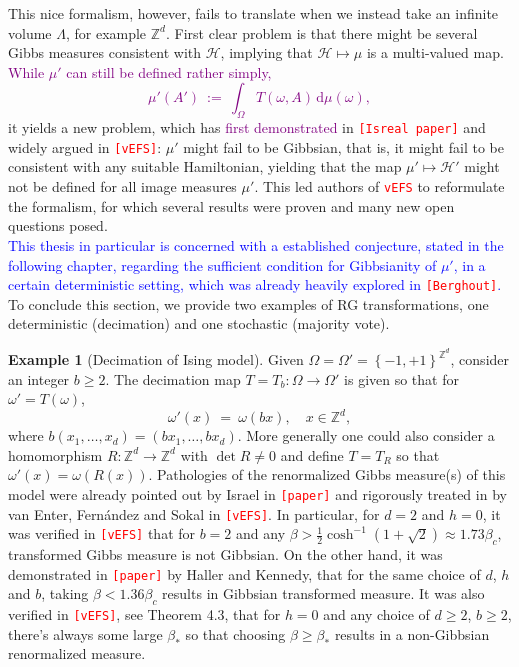 \documentclass[12pt]{article}
\renewcommand{\d}{\mathrm{d}}
\renewcommand{\H}{\mathcal{H}}
\newcommand{\Z}{\mathbb{Z}}
\newcommand{\set}[1]{\left\{#1\right\}}
\newcommand{\ra}{\rightarrow}
\newcommand{\1}{\mathbbm{1}}
\newcommand{\5}{\vspace{0.5cm}}
\theoremstyle{definition}
\newtheorem{ex}[thm]{Example}
\begin{document}
This nice formalism, however, fails to translate when we instead take an infinite volume $\Lambda$, for example $\Z^d$. First clear problem is that there might be several Gibbs measures consistent with $\H$, implying that $\H\mapsto\mu$ is a multi-valued map. \textcolor{purple}{While $\mu'$ can still be defined rather simply,
$$\mu'(A') ~:=~ \int_\Omega T(\omega,A)\,\d\mu(\omega),$$}
it yields a new problem, which has \textcolor{purple}{first demonstrated} in \textcolor{red}{\texttt{[Isreal paper]}} and widely argued in \textcolor{red}{\texttt{[vEFS]}}: $\mu'$ might fail to be Gibbsian, that is, it might fail to be consistent with any suitable Hamiltonian, yielding that the map $\mu'\mapsto\H'$ might not be defined for all image measures $\mu'$. This led authors of \textcolor{red}{\texttt{vEFS}} to reformulate the formalism, for which several results were proven and many new open questions posed. \\

\textcolor{blue}{This thesis in particular is concerned with a established conjecture, stated in the following chapter, regarding the sufficient condition for Gibbsianity of $\mu'$, in a certain deterministic setting, which was already heavily explored in \textcolor{red}{\texttt{[Berghout]}}.} \\

To conclude this section, we provide two examples of RG transformations, one deterministic (decimation) and one stochastic (majority vote).

\begin{ex}[Decimation of Ising model]
Given $\Omega=\Omega'=\set{-1,+1}^{\Z^d}$, consider an integer $b\geq 2$. The decimation map $T=T_b:\Omega\ra\Omega'$ is given so that for $\omega'=T(\omega)$,
$$\omega'(x) ~=~ \omega(bx), \quad x\in\Z^d,$$
where $b(x_1,\ldots,x_d)=(bx_1,\ldots,bx_d)$. More generally one could also consider a homomorphism $R:\Z^d\ra\Z^d$ with $\det R\neq 0$ and define $T=T_R$ so that $\omega'(x)=\omega(R(x))$. Pathologies of the renormalized Gibbs measure(s) of  this model were already pointed out by Israel in \textcolor{red}{\texttt{[paper]}} and rigorously treated in by van Enter, Fern\'andez and Sokal in \textcolor{red}{\texttt{[vEFS]}}. In particular, for $d=2$ and $h=0$, it was verified in \textcolor{red}{\texttt{[vEFS]}} that for $b=2$ and any $\beta>\frac{1}{2}\cosh^{-1}(1+\sqrt{2})\approx 1.73\beta_c$, transformed Gibbs measure is not Gibbsian. On the other hand, it was demonstrated in \textcolor{red}{\texttt{[paper]}} by Haller and Kennedy, that for the same choice of $d$, $h$ and $b$, taking $\beta<1.36\beta_c$ results in Gibbsian transformed measure. It was also verified in \textcolor{red}{\texttt{[vEFS]}}, see Theorem 4.3, that for $h=0$ and any choice of $d\geq 2$, $b\geq 2$, there's always some large $\beta_*$ so that choosing $\beta\geq \beta_*$ results in a non-Gibbsian renormalized measure.
\end{ex}
\end{document}

